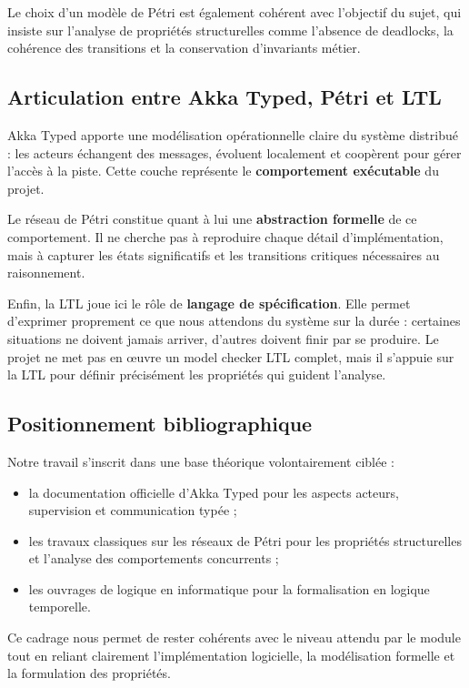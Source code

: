 \documentclass[11pt,a4paper]{article}
\begin{document}
Le choix d'un modèle de Pétri est également cohérent avec l'objectif du sujet, qui insiste sur l'analyse de propriétés structurelles comme l'absence de deadlocks, la cohérence des transitions et la conservation d'invariants métier.

\subsection{Articulation entre Akka Typed, Pétri et LTL}

Akka Typed apporte une modélisation opérationnelle claire du système distribué : les acteurs échangent des messages, évoluent localement et coopèrent pour gérer l'accès à la piste. Cette couche représente le \textbf{comportement exécutable} du projet.

Le réseau de Pétri constitue quant à lui une \textbf{abstraction formelle} de ce comportement. Il ne cherche pas à reproduire chaque détail d'implémentation, mais à capturer les états significatifs et les transitions critiques nécessaires au raisonnement.

Enfin, la LTL joue ici le rôle de \textbf{langage de spécification}. Elle permet d'exprimer proprement ce que nous attendons du système sur la durée : certaines situations ne doivent jamais arriver, d'autres doivent finir par se produire. Le projet ne met pas en œuvre un model checker LTL complet, mais il s'appuie sur la LTL pour définir précisément les propriétés qui guident l'analyse.

\subsection{Positionnement bibliographique}

Notre travail s'inscrit dans une base théorique volontairement ciblée :
\begin{itemize}
    \item la documentation officielle d'Akka Typed pour les aspects acteurs, supervision et communication typée ;
    \item les travaux classiques sur les réseaux de Pétri pour les propriétés structurelles et l'analyse des comportements concurrents ;
    \item les ouvrages de logique en informatique pour la formalisation en logique temporelle.
\end{itemize}

Ce cadrage nous permet de rester cohérents avec le niveau attendu par le module tout en reliant clairement l'implémentation logicielle, la modélisation formelle et la formulation des propriétés.
\end{document}
